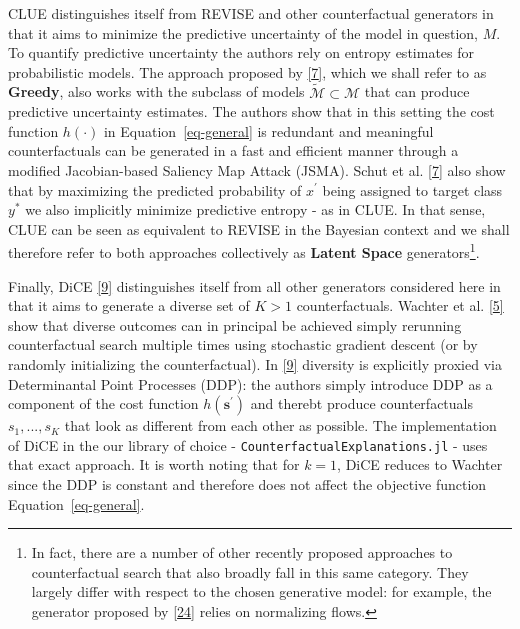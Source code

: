 \documentclass[
  conference]{IEEEtran}
\begin{document}
CLUE distinguishes itself from REVISE and other counterfactual
generators in that it aims to minimize the predictive uncertainty of the
model in question, \(M\). To quantify predictive uncertainty the authors
rely on entropy estimates for probabilistic models. The approach
proposed by \protect\hyperlink{ref-schut2021generating}{{[}7{]}}, which
we shall refer to as \textbf{Greedy}, also works with the subclass of
models \(\tilde{\mathcal{M}}\subset\mathcal{M}\) that can produce
predictive uncertainty estimates. The authors show that in this setting
the cost function \(h(\cdot)\) in Equation~\ref{eq-general} is redundant
and meaningful counterfactuals can be generated in a fast and efficient
manner through a modified Jacobian-based Saliency Map Attack (JSMA).
Schut et al. \protect\hyperlink{ref-schut2021generating}{{[}7{]}} also
show that by maximizing the predicted probability of \(x^\prime\) being
assigned to target class \(y^*\) we also implicitly minimize predictive
entropy - as in CLUE. In that sense, CLUE can be seen as equivalent to
REVISE in the Bayesian context and we shall therefore refer to both
approaches collectively as \textbf{Latent Space} generators\footnote{In
  fact, there are a number of other recently proposed approaches to
  counterfactual search that also broadly fall in this same category.
  They largely differ with respect to the chosen generative model: for
  example, the generator proposed by
  \protect\hyperlink{ref-dombrowski2021diffeomorphic}{{[}24{]}} relies
  on normalizing flows.}.

Finally, DiCE \protect\hyperlink{ref-mothilal2020explaining}{{[}9{]}}
distinguishes itself from all other generators considered here in that
it aims to generate a diverse set of \(K>1\) counterfactuals. Wachter et
al. \protect\hyperlink{ref-wachter2017counterfactual}{{[}5{]}} show that
diverse outcomes can in principal be achieved simply rerunning
counterfactual search multiple times using stochastic gradient descent
(or by randomly initializing the counterfactual). In
\protect\hyperlink{ref-mothilal2020explaining}{{[}9{]}} diversity is
explicitly proxied via Determinantal Point Processes (DDP): the authors
simply introduce DDP as a component of the cost function
\(h(\mathbf{s}^\prime)\) and therebt produce counterfactuals
\(s_1, ... , s_K\) that look as different from each other as possible.
The implementation of DiCE in the our library of choice -
\texttt{CounterfactualExplanations.jl} - uses that exact approach. It is
worth noting that for \(k=1\), DiCE reduces to Wachter since the DDP is
constant and therefore does not affect the objective function
Equation~\ref{eq-general}.
\end{document}
